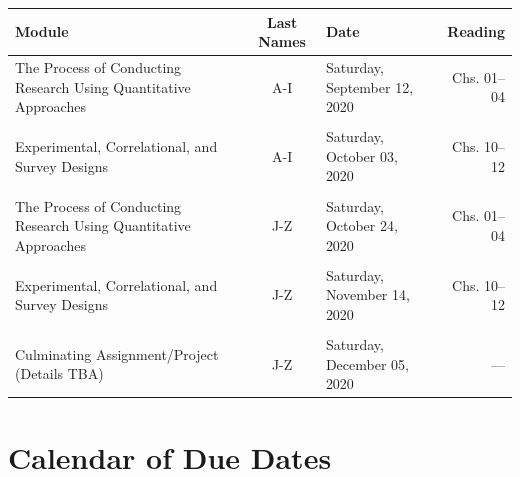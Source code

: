 \documentclass[
]{article}
\begin{document}
\begin{tabularx}{\linewidth}{XcXr}
\hline
\textbf{Module} & \textbf{Last Names} & \textbf{Date} & \textbf{Reading} \\
\hline

The Process of Conducting Research Using Quantitative Approaches & A-I & Saturday, September 12, 2020 & Chs. 01--04 \\
 &  &  &  \\
 
Experimental, Correlational, and Survey Designs & A-I & Saturday, October 03, 2020 & Chs. 10--12 \\
 &  &  & \\
 
The Process of Conducting Research Using Quantitative Approaches & J-Z & Saturday, October 24, 2020 & Chs. 01--04 \\
 &  &  & \\
 
Experimental, Correlational, and Survey Designs & J-Z & Saturday, November 14, 2020 & Chs. 10--12 \\
 &  &  &  \\
 
Culminating Assignment/Project \newline (Details TBA) & J-Z & Saturday, December 05, 2020 & --- \\
\hline
\end{tabularx}

\newpage
\section{Calendar of Due Dates}
\end{document}
